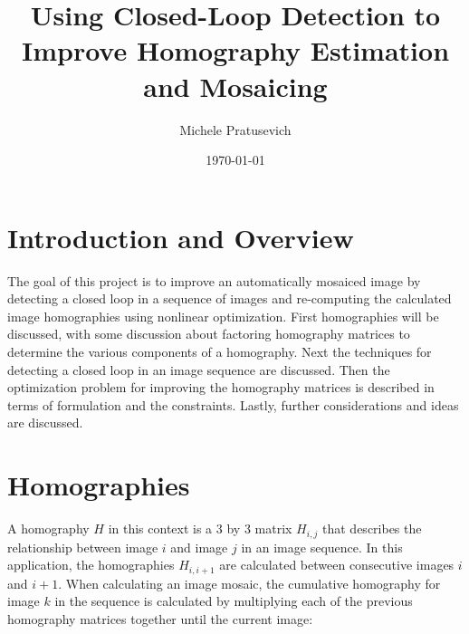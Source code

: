 \documentclass{article}
\title{Using Closed-Loop Detection to Improve Homography Estimation and Mosaicing}
\author{Michele Pratusevich}
\date{\today}
\begin{document}
 
\maketitle
\tableofcontents

%
%

\section{Introduction and Overview}

The goal of this project is to improve an automatically mosaiced image by
detecting a closed loop in a sequence of images and re-computing the calculated
image homographies using nonlinear optimization. First homographies will be
discussed, with some discussion about factoring homography matrices to
determine the various components of a homography. Next the techniques for
detecting a closed loop in an image sequence are discussed. Then the
optimization problem for improving the homography matrices is described in
terms of formulation and the constraints. Lastly, further considerations and
ideas are discussed. 

\section{Homographies}

A homography $H$ in this context is a $3$ by $3$ matrix $H_{i, j}$ that
describes the relationship between image $i$ and image $j$ in an image
sequence. In this application, the homographies $H_{i, i + 1}$ are calculated
between consecutive images $i$ and $i + 1$. When calculating an image mosaic,
the cumulative homography for image $k$ in the sequence is calculated by
multiplying each of the previous homography matrices together until the current
image: 
\end{document}
